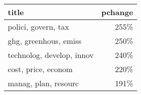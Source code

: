 \begin{tabular}{p{1.2cm}r}
\toprule
                     title &  pchange \\
\midrule
       polici, govern, tax &     255\% \\
     ghg, greenhous, emiss &     250\% \\
 technolog, develop, innov &     240\% \\
       cost, price, econom &     220\% \\
      manag, plan, resourc &     191\% \\
\bottomrule
\end{tabular}
